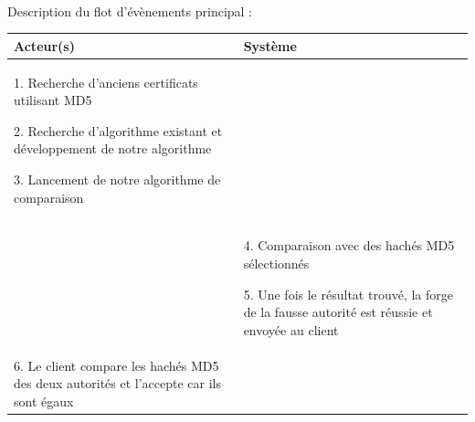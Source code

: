 \documentclass[a4paper,11pt,french]{article}
\begin{document}
~\\

Description du flot d'évènements principal :

\begin{tabular}{|m{8cm}|m{8cm}|}
   \hline
  \rowcolor[gray]{.8} Acteur(s) & Système \\
   \hline
   1. Recherche d'anciens certificats utilisant MD5

2. Recherche d'algorithme existant et développement de notre algorithme

3. Lancement de notre algorithme de comparaison
 & \\
   \hline

& 4. Comparaison avec des hachés MD5 sélectionnés

5. Une fois le résultat trouvé, la forge de la fausse autorité est réussie et envoyée au client

    \\
   \hline
   6. Le client compare les hachés MD5 des deux autorités et l'accepte car ils sont égaux & \\
   \hline
\end{tabular}
\end{document}
